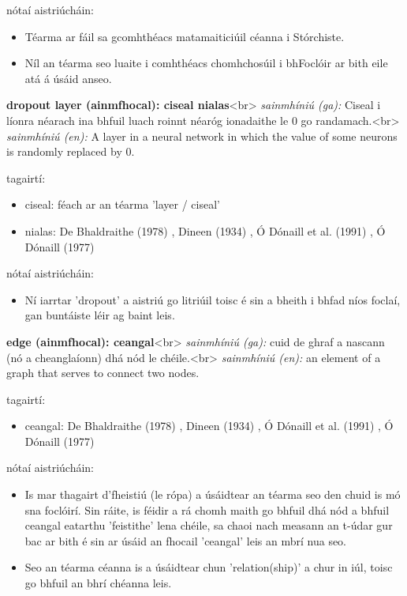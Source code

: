 \documentclass{article}
\begin{document}
nótaí aistriúcháin:
\begin{itemize}
	\item Téarma ar fáil sa gcomhthéacs matamaiticiúil céanna i Stórchiste.
	\item Níl an téarma seo luaite i comhthéacs chomhchosúil i bhFoclóir ar bith eile atá á úsáid anseo.
\end{itemize}


\textbf{dropout layer (ainmfhocal): ciseal nialas}<br>
\textit{sainmhíniú (ga):} Ciseal i líonra néarach ina bhfuil luach roinnt néaróg ionadaithe le 0 go randamach.<br>
\textit{sainmhíniú (en):} A layer in a neural network in which the value of some neurons is randomly replaced by 0.

tagairtí:
\begin{itemize}
	\item ciseal: féach ar an téarma 'layer / ciseal'
	\item nialas: De Bhaldraithe (1978) \cite{de-bhaldraithe}, Dineen (1934) \cite{dineen}, Ó Dónaill et al. (1991) \cite{focloir-beag}, Ó Dónaill (1977) \cite{odonaill}
\end{itemize}

nótaí aistriúcháin:
\begin{itemize}
	\item Ní iarrtar 'dropout' a aistriú go litriúil toisc é sin a bheith i bhfad níos foclaí, gan buntáiste léir ag baint leis.
\end{itemize}


\textbf{edge (ainmfhocal): ceangal}<br>
\textit{sainmhíniú (ga):} cuid de ghraf a nascann (nó a cheanglaíonn) dhá nód le chéile.<br>
\textit{sainmhíniú (en):} an element of a graph that serves to connect two nodes.

tagairtí:
\begin{itemize}
	\item ceangal: De Bhaldraithe (1978) \cite{de-bhaldraithe}, Dineen (1934) \cite{dineen}, Ó Dónaill et al. (1991) \cite{focloir-beag}, Ó Dónaill (1977) \cite{odonaill}
\end{itemize}

nótaí aistriúcháin:
\begin{itemize}
	\item Is mar thagairt d'fheistiú (le rópa) a úsáidtear an téarma seo den chuid is mó sna foclóirí. Sin ráite, is féidir a rá chomh maith go bhfuil dhá nód a bhfuil ceangal eatarthu 'feistithe' lena chéile, sa chaoi nach measann an t-údar gur bac ar bith é sin ar úsáid an fhocail 'ceangal' leis an mbrí nua seo.
	\item Seo an téarma céanna is a úsáidtear chun 'relation(ship)' a chur in iúl, toisc go bhfuil an bhrí chéanna leis.
\end{itemize}
\end{document}
